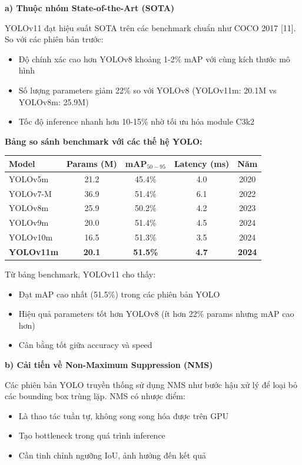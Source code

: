 \textbf{a) Thuộc nhóm State-of-the-Art (SOTA)}

YOLOv11 đạt hiệu suất SOTA trên các benchmark chuẩn như COCO 2017 [11]. So với các phiên bản trước:
\begin{itemize}
    \item Độ chính xác cao hơn YOLOv8 khoảng 1-2\% mAP với cùng kích thước mô hình
    \item Số lượng parameters giảm 22\% so với YOLOv8 (YOLOv11m: 20.1M vs YOLOv8m: 25.9M)
    \item Tốc độ inference nhanh hơn 10-15\% nhờ tối ưu hóa module C3k2
\end{itemize}

\textbf{Bảng so sánh benchmark với các thế hệ YOLO:}

\begin{table}[h!]
\centering
\begin{tabular}{|l|c|c|c|c|}
\hline
\textbf{Model} & \textbf{Params (M)} & \textbf{mAP$_{50-95}$} & \textbf{Latency (ms)} & \textbf{Năm} \\
\hline
YOLOv5m & 21.2 & 45.4\% & 4.0 & 2020 \\
\hline
YOLOv7-M & 36.9 & 51.4\% & 6.1 & 2022 \\
\hline
YOLOv8m & 25.9 & 50.2\% & 4.2 & 2023 \\
\hline
YOLOv9m & 20.0 & 51.4\% & 4.5 & 2024 \\
\hline
YOLOv10m & 16.5 & 51.3\% & 3.5 & 2024 \\
\hline
\rowcolor{yellow!20}
\textbf{YOLOv11m} & \textbf{20.1} & \textbf{51.5\%} & \textbf{4.7} & \textbf{2024} \\
\hline
\end{tabular}
\label{tab:yolo_benchmark_comparison}
\end{table}

Từ bảng benchmark, YOLOv11 cho thấy:
\begin{itemize}
    \item Đạt mAP cao nhất (51.5\%) trong các phiên bản YOLO
    \item Hiệu quả parameters tốt hơn YOLOv8 (ít hơn 22\% params nhưng mAP cao hơn)
    \item Cân bằng tốt giữa accuracy và speed
\end{itemize}


\textbf{b) Cải tiến về Non-Maximum Suppression (NMS)}

Các phiên bản YOLO truyền thống sử dụng NMS như bước hậu xử lý để loại bỏ các bounding box trùng lặp. NMS có nhược điểm:
\begin{itemize}
    \item Là thao tác tuần tự, không song song hóa được trên GPU
    \item Tạo bottleneck trong quá trình inference
    \item Cần tinh chỉnh ngưỡng IoU, ảnh hưởng đến kết quả
\end{itemize}

